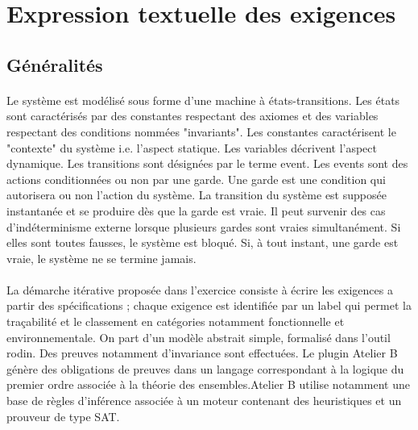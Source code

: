 \section{Expression textuelle des exigences}




\subsection{Généralités}
\paragraph{}
Le système est modélisé sous forme d'une machine à états-transitions. Les états sont caractérisés par des constantes respectant des axiomes et des variables respectant des conditions nommées "invariants". Les constantes caractérisent le "contexte" du système i.e. l'aspect statique. Les variables décrivent l'aspect dynamique. Les transitions sont désignées par le terme event. Les events sont des actions conditionnées ou non par une garde. Une garde est une condition qui autorisera ou non l'action du système. La transition du système est supposée instantanée et se produire dès que la garde est vraie. Il peut survenir des cas d'indéterminisme externe lorsque plusieurs gardes sont vraies simultanément. Si elles sont toutes fausses, le système est bloqué. Si, à tout instant, une garde est vraie, le système ne se termine jamais.

\paragraph{}
La démarche itérative proposée dans l'exercice consiste à écrire les exigences a partir des spécifications ; chaque exigence est identifiée par un label qui permet la traçabilité et le classement en catégories notamment fonctionnelle et environnementale. On part d'un modèle abstrait simple, formalisé dans l'outil rodin. Des preuves notamment d'invariance sont effectuées. Le plugin Atelier B génère des obligations de preuves dans un langage correspondant à la logique du premier ordre associée à la théorie des ensembles.Atelier B utilise notamment une base de règles d’inférence associée à un moteur contenant des heuristiques et un prouveur de type SAT.

